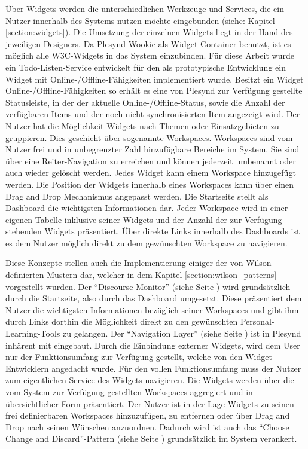 Über Widgets werden die unterschiedlichen Werkzeuge und Services, die ein Nutzer innerhalb des Systems nutzen möchte eingebunden (siehe: Kapitel \ref{section:widgets}). Die Umsetzung der einzelnen Widgets liegt in der Hand des jeweiligen Designers. Da Plesynd Wookie als Widget Container benutzt, ist es möglich alle W3C-Widgets in das System einzubinden. Für diese Arbeit wurde ein Todo-Listen-Service entwickelt für den als prototypische Entwicklung ein Widget mit Online-/Offline-Fähigkeiten implementiert wurde. Besitzt ein Widget Online-/Offline-Fähigkeiten so erhält es eine von Plesynd zur Verfügung gestellte Statusleiste, in der der aktuelle Online-/Offline-Status, sowie die Anzahl der verfügbaren Items und der noch nicht synchronisierten Item angezeigt wird. Der Nutzer hat die Möglichkeit Widgets nach Themen oder Einsatzgebieten zu gruppieren. Dies geschieht über sogenannte Workspaces. Workspaces sind vom Nutzer frei und in unbegrenzter Zahl hinzufügbare Bereiche im System. Sie sind über eine Reiter-Navigation zu erreichen und können jederzeit umbenannt oder auch wieder gelöscht werden. Jedes Widget kann einem Workspace hinzugefügt werden. Die Position der Widgets innerhalb eines Workspaces kann über einen Drag and Drop Mechanismus angepasst werden. Die Startseite stellt als Dashboard die wichtigsten Informationen dar. Jeder Workspace wird in einer eigenen Tabelle inklusive seiner Widgets und der Anzahl der zur Verfügung stehenden Widgets präsentiert. Über direkte Links innerhalb des Dashboards ist es dem Nutzer möglich direkt zu dem gewünschten Workspace zu navigieren.

Diese Konzepte stellen auch die Implementierung einiger der von Wilson definierten Mustern dar, welcher in dem Kapitel \ref{section:wilson_patterns} vorgestellt wurden.  Der "`Discourse Monitor"' (siehe Seite \pageref{wilson_patterns:discourse_monitor}) wird grundsätzlich durch die Startseite, also durch das Dashboard umgesetzt. Diese präsentiert dem Nutzer die wichtigsten Informationen bezüglich seiner Workspaces und gibt ihm durch Links dorthin die Möglichkeit direkt zu den gewünschten Personal-Learning-Tools zu gelangen. Der "`Navigation Layer"' (siehe Seite \pageref{wilson_patterns:navigation_layer}) ist in Plesynd inhärent mit eingebaut. Durch die Einbindung externer Widgets, wird dem User nur der Funktionsumfang zur Verfügung gestellt, welche von den Widget-Entwicklern angedacht wurde. Für den vollen Funktionsumfang muss der Nutzer zum eigentlichen Service des Widgets navigieren. Die Widgets werden über die vom System zur Verfügung gestellten Workspaces aggregiert und in übersichtlicher Form präsentiert. Der Nutzer ist in der Lage Widgets zu seinen frei definierbaren Workspaces hinzuzufügen, zu entfernen oder über Drag and Drop nach seinen Wünschen anzuordnen. Dadurch wird ist auch das "`Choose Change and Discard"'-Pattern (siehe Seite \pageref{wilson_patterns:choose_change_discard}) grundsätzlich im System verankert.

